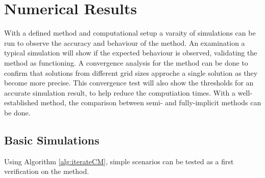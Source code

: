 \section{Numerical Results}

  With a defined method and computational setup a varaity of simulations can be run to observe the accuracy and behaviour of the method.
  An examination a typical simulation will show if the expected behaviour is observed, validating the method as functioning.
  A convergence analysis for the method can be done to confirm that solutions from different grid sizes approche a single solution as they become more precise.
  This convergence test will also show the thresholds for an accurate simulation result, to help reduce the computiation times.
  With a well-established method, the comparison between semi- and fully-implicit methods can be done.

\subsection{Basic Simulations}

  Using Algorithm \ref{alg:iterateCM}, simple scenarios can be tested as a first verification on the method.

  

